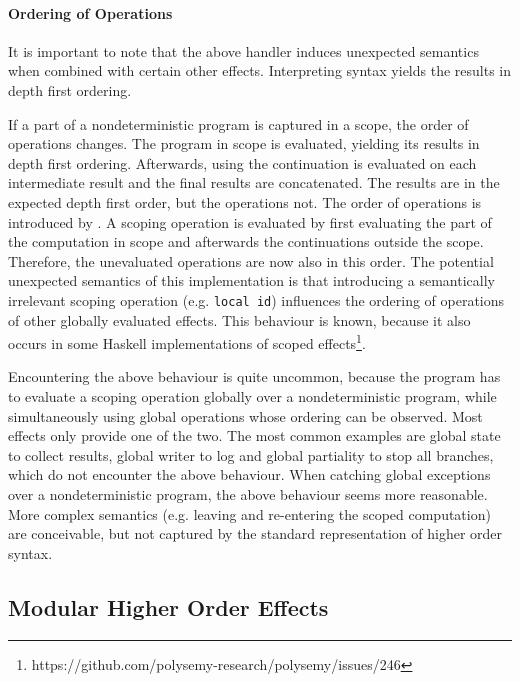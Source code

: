 \paragraph{Ordering of Operations}
It is important to note that the above handler induces unexpected semantics when
combined with certain other effects.
Interpreting  syntax yields the results in depth first
ordering.

If a part of a nondeterministic program is captured in a scope, the order of
operations changes.
The program in scope is evaluated, yielding its results in depth first ordering.
Afterwards, using  the continuation is evaluated on each
intermediate result and the final results are concatenated.
The results are in the expected depth first order, but the operations not.
The order of operations is introduced by \AgdaFunction{>>=}.
A scoping operation is evaluated by first evaluating the part of the computation
in scope and afterwards the continuations outside the scope.
Therefore, the unevaluated operations are now also in this order.
The potential unexpected semantics of this implementation is that introducing a
semantically irrelevant scoping operation (e.g. \texttt{local id}) influences
the ordering of operations of other globally evaluated effects.
This behaviour is known, because it also occurs in some Haskell implementations
of scoped
effects\footnote{https://github.com/polysemy-research/polysemy/issues/246}.

Encountering the above behaviour is quite uncommon, because the program has to
evaluate a scoping operation globally over a nondeterministic program, while
simultaneously using global operations whose ordering can be observed.
Most effects only provide one of the two.
The most common examples are global state to collect results, global writer to
log and global partiality to stop all branches, which do not encounter the above
behaviour.
When catching global exceptions over a nondeterministic program, the above
behaviour seems more reasonable.
More complex semantics (e.g. leaving and re-entering the scoped computation) are
conceivable, but not captured by the standard representation of higher order
syntax.


\subsection{Modular Higher Order Effects}

